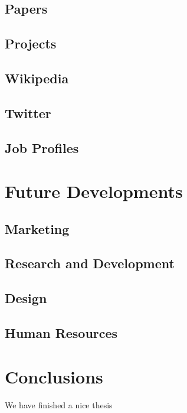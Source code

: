 \documentclass[]{book}
\theoremstyle{definition}
\theoremstyle{definition}
\theoremstyle{definition}
\theoremstyle{remark}
\begin{document}
\section{Papers}\label{papers-1}

\section{Projects}\label{projects-1}

\section{Wikipedia}\label{wikipedia-1}

\section{Twitter}\label{twitter-1}

\section{Job Profiles}\label{job-profiles-1}

\chapter{Future Developments}\label{future-developments}

\section{Marketing}\label{marketing}

\section{Research and Development}\label{research-and-development}

\section{Design}\label{design}

\section{Human Resources}\label{human-resources}

\chapter{Conclusions}\label{conclusions}

We have finished a nice thesis


\end{document}
